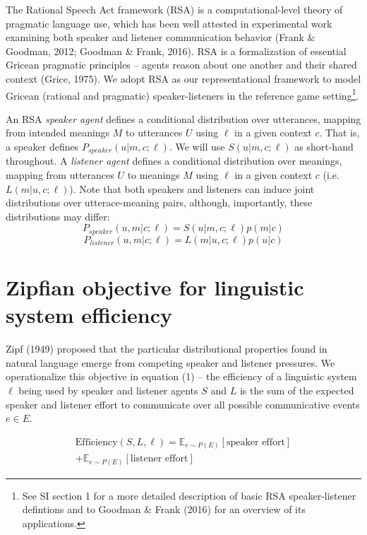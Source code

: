 \documentclass[10pt, letterpaper]{article}
\begin{document}
The Rational Speech Act framework (RSA) is a computational-level theory
of pragmatic language use, which has been well attested in experimental
work examining both speaker and listener communication behavior (Frank
\& Goodman, 2012; Goodman \& Frank, 2016). RSA is a formalization of
essential Gricean pragmatic principles -- agents reason about one
another and their shared context (Grice, 1975). We adopt RSA as our
representational framework to model Gricean (rational and pragmatic)
speaker-listeners in the reference game
setting\footnote{See SI section 1 for a more detailed description of basic RSA speaker-listener defintions and to Goodman \& Frank (2016) for an overview of its applications.}.\par

An RSA \emph{speaker agent} defines a conditional distribution over
utterances, mapping from intended meanings \(M\) to utterances \(U\)
using \(\ell\) in a given context \(c\). That is, a speaker defines
\(P_{speaker}(u|m, c; \ell)\). We will use \(S(u|m, c; \ell)\) as
short-hand throughout. A \emph{listener agent} defines a conditional
distribution over meanings, mapping from utterances \(U\) to meanings
\(M\) using \(\ell\) in a given context \(c\) (i.e. \(L(m|u, c;\ell)\)).
Note that both speakers and listeners can induce joint distributions
over utterace-meaning pairs, although, importantly, these distributions
may differ: \[P_{speaker}(u, m | c; \ell) = S(u|m, c; \ell)p(m|c)\]
\[P_{listener}(u, m| c; \ell) = L(m|u, c; \ell)p(u|c)\]

\section{Zipfian objective for linguistic system
efficiency}\label{zipfian-objective-for-linguistic-system-efficiency}

Zipf (1949) proposed that the particular distributional properties found
in natural language emerge from competing speaker and listener
pressures. We operationalize this objective in equation (1) -- the
efficiency of a linguistic system \(\ell\) being used by speaker and
listener agents \(S\) and \(L\) is the sum of the expected speaker and
listener effort to communicate over all possible communicative events
\(e \in E\).\par

\begin{equation}
\begin{split}
  \text{Efficiency}(S, L, \ell) = \mathbb{E}_{e \sim P(E)}[\text{speaker effort}] \\+ \mathbb{E}_{e \sim P(E)}[\text{listener effort}]
\end{split}
\end{equation}
\end{document}
